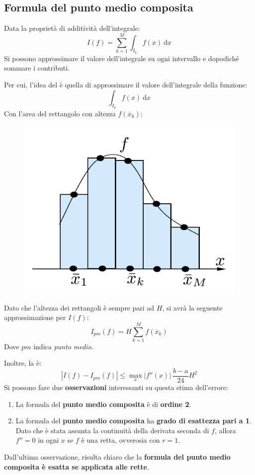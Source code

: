 \subsection{Formula del punto medio composita}

Data la proprietà di additività dell'integrale:
\begin{equation*}
	I\left(f\right) = \displaystyle\sum_{k=1}^{M} \int_{I_{k}} f\left(x\right) \:\mathrm{d}x
\end{equation*}
Si possono approssimare il valore dell'integrale su ogni intervallo e dopodiché sommare i contributi.

\highspace
Per cui, l'idea del  è quella di approssimare il valore dell'integrale della funzione:
\begin{equation*}
	\int_{I_{k}} f\left(x\right) \:\mathrm{d}x
\end{equation*}
Con l'area del rettangolo con altezza $f\left(\overline{x}_{k}\right)$:
\begin{figure}[!htp]
	\centering
	\includegraphics[width=.4\textwidth]{img/formule-di-quadratura-2.png}
\end{figure}

\noindent
Dato che l'altezza dei rettangoli è sempre pari ad $H$, si avrà la seguente approssimazione per $I\left(f\right)$:
\begin{equation}
	I_{pm}\left(f\right) = H \displaystyle\sum_{k=1}^{M} f\left(\overline{x}_{k}\right)
\end{equation}
Dove $pm$ indica \emph{punto medio}.

\highspace
Inoltre, la  è:
\begin{equation}
	\left|I\left(f\right) - I_{pm}\left(f\right)\right| \le \underset{x}{\max}\left|f'' \left(x\right)\right| \: \dfrac{b-a}{24} H^{2}
\end{equation}
Si possono fare due \textbf{osservazioni} interessanti su questa stima dell'errore:\\
\begin{enumerate}
	\item La formula del \textbf{punto medio composita} è di \textbf{ordine 2}.
	
	\item La formula del \textbf{punto medio composita} ha \textbf{grado di esattezza pari a 1}. Dato che è stata assunta la continuità della derivata seconda di $f$, allora $f''=0$ in ogni $x$ se $f$ è una retta, ovverosia con $r=1$.
\end{enumerate}
Dall'ultima osservazione, risulta chiaro che la \textbf{formula del punto medio composita è esatta se applicata alle rette}.